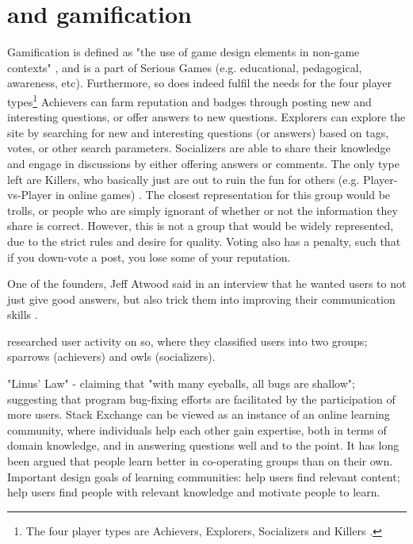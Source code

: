 \label{chap:chapter2}

\section{ and gamification}
\label{sec:gamification}
Gamification is defined as "the use of game design elements in non-game contexts" \cite{Deterding2011}, and is a part of Serious Games (e.g. educational, pedagogical, awareness, etc). 
Furthermore, \gls{so} does indeed fulfil the needs for the four player types\footnote{The four player types are Achievers, Explorers, Socializers and Killers \cite[p.~3]{Maan2013}.}
Achievers can farm reputation and badges through posting new and interesting questions, or offer answers to new questions. 
Explorers can explore the site by searching for new and interesting questions (or answers) based on tags, votes, or other search parameters. 
Socializers are able to share their knowledge and engage in discussions by either offering answers or comments.
The only type left are Killers, who basically just are out to ruin the fun for others (e.g. Player-vs-Player in online games) \cite[p.~3]{Maan2013}. 
The closest representation for this group would be trolls, or people who are simply ignorant of whether or not the information they share is correct.
However, this is not a group that would be widely represented, due to the strict rules and desire for quality. 
Voting also has a penalty, such that if you down-vote a post, you lose some of your reputation.

One of the founders, Jeff Atwood said in an interview that he wanted users to not just give good answers, but also trick them into improving their communication skills \cite{Posnett2012}.

\cite{Yang2014} researched user activity on \gls{so}, where they classified users into two groups; sparrows (achievers) and owls (socializers).




"Linus' Law" - claiming that "with many eyeballs, all bugs are shallow"; suggesting that program bug-fixing efforts are facilitated by the participation of more users.
Stack Exchange can be viewed as an instance of an online learning community, where individuals help each other gain expertise, both in terms of domain knowledge, and in answering questions well and to the point. It has long been argued that people learn better in co-operating groups than on their own. Important design goals of learning communities: help users find relevant content; help users find people with relevant knowledge and motivate people to learn.
\cite{Posnett2012}


